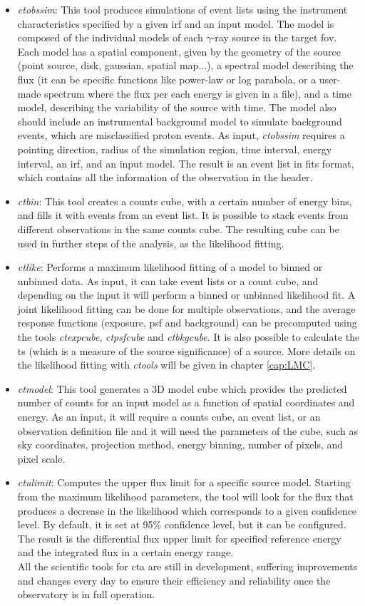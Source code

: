 \documentclass[main.tex]{subfiles}
\begin{document}
\begin{itemize}
\item \textit{ctobssim}: This tool produces simulations of event lists using the instrument characteristics specified by a given \gls{irf} and an input model. The model is composed of the individual models of each $\gamma$-ray source in the target \gls{fov}. Each model has a spatial component, given by the geometry of the source (point source, disk, gaussian, spatial map...), a spectral model describing the flux (it can be specific functions like power-law or log parabola, or a user-made spectrum where the flux per each energy is given in a file), and a time model, describing the variability of the source with time. The model also should include an instrumental background model to simulate background events, which are misclassified proton events.
  As input, \textit{ctobssim} requires a pointing direction, radius of the simulation region, time interval, energy interval, an \gls{irf}, and an input model. The result is an event list in fits format, which contains all the information of the observation in the header.
\item \textit{ctbin}: This tool creates a counts cube, with a certain number of energy bins, and fills it with events from an event list. It is possible to stack events from different observations in the same counts cube. The resulting cube can be used in further steps of the analysis, as the likelihood fitting.
\item \textit{ctlike}: Performs a maximum likelihood fitting of a model to binned or unbinned data. As input, it can take event lists or a count cube, and depending on the input it will perform a binned or unbinned likelihood fit. A joint likelihood fitting can be done for multiple observations, and the average response functions (exposure, \gls{psf} and background) can be precomputed using the tools \textit{ctexpcube}, \textit{ctpsfcube} and \textit{ctbkgcube}. It is also possible to calculate the \gls{ts} (which is a measure of the source significance) of a source. More details on the likelihood fitting with \textit{ctools} will be given in chapter \ref{cap:LMC}.
\item \textit{ctmodel}: This tool generates a 3D model cube which provides the predicted number of counts for an input model as a function of spatial coordinates and energy. As an input, it will require a counts cube, an event list, or an observation definition file and it will need the parameters of the cube, such as sky coordinates, projection method, energy binning, number of pixels, and pixel scale.
\item \textit{ctulimit}: Computes the upper flux limit for a specific source model. Starting from the maximum likelihood parameters, the tool will look for the flux that produces a decrease in the likelihood which corresponds to a given confidence level. By default, it is set at 95\% confidence level, but it can be configured. The result is the differential flux upper limit for specified reference energy and the integrated flux in a certain energy range.\\

  All the scientific tools for \gls{cta} are still in development, suffering improvements and changes every day to ensure their efficiency and reliability once the observatory is in full operation.

\end{itemize}
\end{document}
